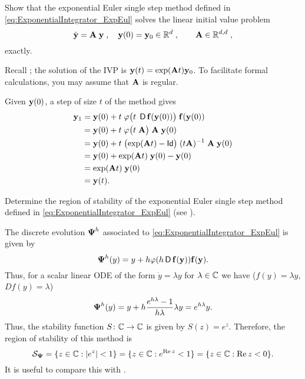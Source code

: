 \begin{problem}


\begin{subproblem}[2] 
\label{subprb:ExponentialIntegrator_1}
Show that the exponential Euler single step method defined in \eqref{eq:ExponentialIntegrator_ExpEul} solves the linear initial value problem 
$$\dot{{\mathbf{y}}} = {\mathbf{A}}\;{\mathbf{y}}\;,\quad {\mathbf{y}}(0) = {\mathbf{y}}_{0}\in\mathbb{R}^{d}\;,\qquad {\mathbf{A}}\in\mathbb{R}^{d,d}\;,$$
exactly.

\begin{hint}
  Recall ; the solution of the IVP is
  ${\mathbf{y}}(t)= \mathrm{exp}({\mathbf{A}} t){\mathbf{y}}_{0}$. To facilitate formal calculations, you may
  assume that ${\mathbf{A}}$ is regular.
\end{hint}

\begin{solution}
Given ${\mathbf{y}}(0)$, a step of size $t$ of the method gives
\begin{align*}
{\mathbf{y}}_1 & = {\mathbf{y}}(0) + t\; \varphi\big(t\; \operatorname{\sf D}{\mathbf{f}}({\mathbf{y}}(0)) \big)\;{\mathbf{f}}({\mathbf{y}}(0))
\\&= {\mathbf{y}}(0) + t\; \varphi\big(t\; {\mathbf{A}} \big)\;{\mathbf{A}}\; {\mathbf{y}}(0) \\
& = {\mathbf{y}}(0) + t\; \big(\mathrm{exp}({\mathbf{A}} t) - \mathsf{Id}\big) \;(t{\mathbf{A}})^{-1}\; {\mathbf{A}}\; {\mathbf{y}}(0)
\\& = {\mathbf{y}}(0) + \mathrm{exp}({\mathbf{A}} t)\;{\mathbf{y}}(0) - {\mathbf{y}}(0) \\
& = \mathrm{exp}({\mathbf{A}} t)\; {\mathbf{y}}(0)
\\ & = {\mathbf{y}}(t).
\end{align*}
\end{solution}
\end{subproblem}



\begin{subproblem}[2] 
Determine the region of stability of the exponential Euler single step method
defined in \eqref{eq:ExponentialIntegrator_ExpEul} (see ).

\begin{solution}
The discrete evolution $\boldsymbol{\Psi}^h$ associated to \eqref{eq:ExponentialIntegrator_ExpEul} is given by
\[
\boldsymbol{\Psi}^h(y) = y+h\varphi(h\operatorname{\sf D}{\mathbf{f}}({\mathbf{y}})){\mathbf{f}}({\mathbf{y}}).
\]
Thus, for a scalar linear ODE of the form $\dot y=\lambda y$ for $\lambda\in\mathbb{C}$ we have ($f(y)=\lambda y$, $Df(y)=\lambda$)
\[
\boldsymbol{\Psi}^h(y)=y+h\frac{e^{h\lambda}-1}{h\lambda}\lambda y = e^{h\lambda} y.
\]
Thus, the stability function $S\colon \mathbb{C}\to\mathbb{C}$ is given by $S(z)=e^z$. Therefore, the region of stability of this method is
\[
\mathcal{S}_{\boldsymbol{\Psi}} =\{z\in\mathbb{C}:|e^z|<1\}=\{z\in\mathbb{C}:e^{\operatorname{Re} z}<1\}=\{z\in\mathbb{C}:\operatorname{Re} z < 0\}.
\]
It is useful to compare this with .


\end{solution}
\end{subproblem}
\end{problem}
